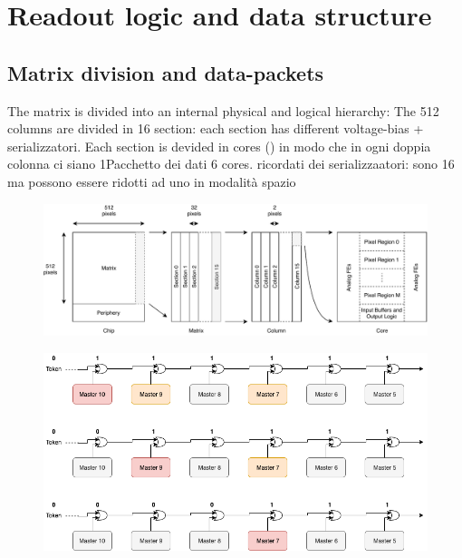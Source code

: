 \section{Readout logic and data structure}
    \subsection{Matrix division and data-packets}
        The matrix is divided into an internal physical and logical hierarchy:
        The 512 columns are divided in 16 section: each section has different voltage-bias + serializzatori.
        Each section is devided in cores () in modo che in ogni doppia colonna ci siano 1Pacchetto dei dati
        6 cores. ricordati dei serializzaatori: sono 16 ma possono essere ridotti ad uno in modalità spazio
        \begin{figure}[h!]
            \centering
            \includegraphics[width=.95\linewidth]{figures/ARCADIA/hierarchy.pdf}
            \caption{}
            \label{fig:hierarchy}
        \end{figure}

        
        \begin{figure}[h!]
            \centering
            \includegraphics[width=.95\linewidth]{figures/ARCADIA/token_chain.png}
            \caption{}
            \label{fig:token_chain}
        \end{figure}


